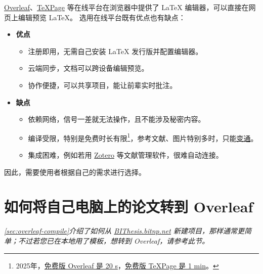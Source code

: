 \href{https://cn.overleaf.com}{Overleaf}、\href{https://www.texpage.com/zh/}{TeXPage} 等在线平台在浏览器中提供了 \LaTeX{} 编辑器，可以直接在网页上编辑预览 \LaTeX{}。
选用在线平台既有优点也有缺点：
\begin{itemize}[noitemsep]
  \item \textbf{优点}
    \begin{itemize}[noitemsep]
      \item ​​注册即用，无需自己安装 \LaTeX{} 发行版并配置编辑器。
      \item 云端同步，文档可以跨设备编辑预览。
      \item 协作便捷，可以共享项目，能让前辈实时批注。
    \end{itemize}
  \item \textbf{缺点}
    \begin{itemize}[noitemsep]
      \item 依赖网络，信号一差就无法操作，且不能涉及秘密内容。
      \item 编译受限，特别是免费时长有限\footnote{2025年，\href{https://cn.overleaf.com/user/subscription/choose-your-plan}{免费版 Overleaf 是 20 s}，\href{https://www.texpage.com/}{免费版 TeXPage 是 1 min}。}，参考文献、图片特别多时，只能\href{https://bithesis.bitnp.net/faq/slow.html}{变通}。
      \item 集成困难，例如若用 \href{https://www.zotero.org}{Zotero} 等文献管理软件，很难自动连接。
    \end{itemize}
\end{itemize}

因此，需要使用者根据自己的需求进行选择。

\section{如何将自己电脑上的论文转到 Overleaf}

\textit{
\cref{sec:overleaf-compile}介绍了如何从 \href{https://bithesis.bitnp.net}{BIThesis.bitnp.net} 新建项目，那样通常更简单；不过若您已在本地用了模板，想转到 Overleaf，请参考此节。
}

